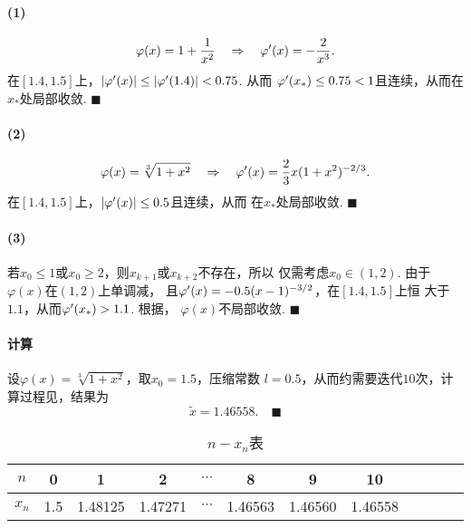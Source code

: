 \paragraph{(1)}
  \[
    \varphi(x) = 1 + \frac{1}{x^2} \quad\Rightarrow\quad
    \varphi^{\prime}(x) = -\frac{2}{x^3}.
  \]
  在$[1.4, 1.5]$上，$|\varphi^{\prime}(x)|\le|\varphi^{\prime}(1.4)|<0.75$. 从而
  $\varphi^{\prime}(x_*)\le 0.75<1$且连续，从而在$x_*$处局部收敛. $\blacksquare$
\paragraph{(2)}
  \[
    \varphi(x) = \sqrt[3]{1+x^2}\quad\Rightarrow\quad
    \varphi^{\prime}(x) = \frac{2}{3}x(1+x^2)^{-2/3}.
  \]
  在$[1.4, 1.5]$上，$|\varphi^{\prime}(x)|\le 0.5$且连续，从而
  在$x_*$处局部收敛. $\blacksquare$
\paragraph{(3)}
  若$x_0\le 1$或$x_0\ge 2$，则$x_{k+1}$或$x_{k+2}$不存在，所以
  仅需考虑$x_0\in(1, 2)$. 由于$\varphi(x)$在$(1, 2)$上单调减，
  且$\varphi^{\prime}(x) = -0.5(x-1)^{-3/2}$，在$[1.4, 1.5]$上恒
  大于$1.1$，从而$\varphi^{\prime}(x_*)>1.1$. 根据，
  $\varphi(x)$不局部收敛. $\blacksquare$
\paragraph{计算}
  设$\varphi(x) = \sqrt[3]{1+x^2}$，取$x_0 = 1.5$，压缩常数
  $l=0.5$，从而约需要迭代$10$次，计算过程见，结果为
  \[
    \tilde{x} = 1.46558.\quad\blacksquare
  \]
  \begin{table}[htbp]
    \centering
    \caption{$n-x_n$表}
    \label{table}
    \begin{tabular}{c|ccccccccccc}
    \hline
    $n$    & 0   & 1        & 2  & $\cdots$ & 8       & 9       & 10      \\ \hline
    $x_n$ & 1.5 & 1.48125 & 1.47271 & $\cdots$ & 1.46563 & 1.46560 & 1.46558 \\ \hline
    \end{tabular}
  \end{table}



